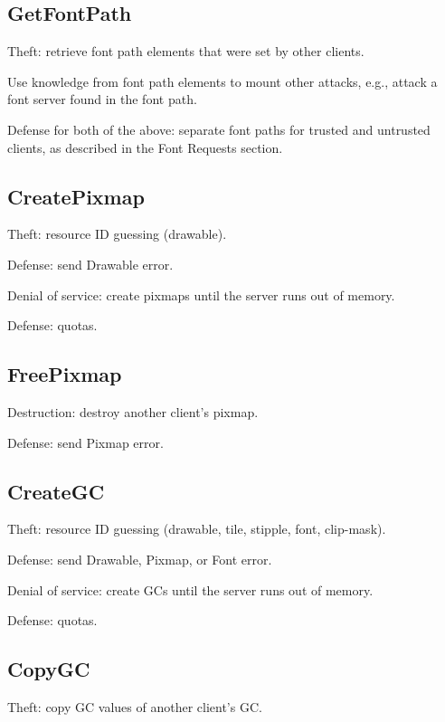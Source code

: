 \subsection{GetFontPath}

Theft: retrieve font path elements that were set by other clients.

Use knowledge from font path elements to mount other attacks,
e.g., attack a font server found in the font path.

Defense for both of the above: separate font paths for trusted and
untrusted clients, as described in the Font Requests section.



\subsection{CreatePixmap}

Theft: resource ID guessing (drawable).

Defense: send Drawable error.

Denial of service: create pixmaps until the server runs out of memory.

Defense: quotas.



\subsection{FreePixmap}

Destruction: destroy another client's pixmap.

Defense: send Pixmap error.


\subsection{CreateGC}

Theft: resource ID guessing (drawable, tile, stipple, font, clip-mask).

Defense: send Drawable, Pixmap, or Font error.

Denial of service: create GCs until the server runs out of memory.

Defense: quotas.



\subsection{CopyGC}

Theft: copy GC values of another client's GC.

